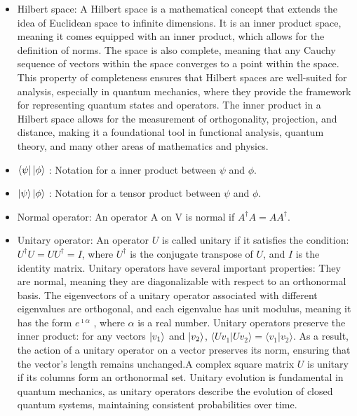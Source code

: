 \documentclass{article}
\begin{document}
		\begin{itemize}
			\item Hilbert space: A Hilbert space is a mathematical concept that extends the idea of Euclidean space to infinite dimensions. It is an inner product space, meaning it comes equipped with an inner product, which allows for the definition of norms. The space is also complete, meaning that any Cauchy sequence of vectors within the space converges to a point within the space. This property of completeness ensures that Hilbert spaces are well-suited for analysis, especially in quantum mechanics, where they provide the framework for representing quantum states and operators. The inner product in a Hilbert space allows for the measurement of orthogonality, projection, and distance, making it a foundational tool in functional analysis, quantum theory, and many other areas of mathematics and physics.
			
			\item $\bra{\psi}\ket{\phi}$ : Notation for a inner product between $\psi$ and $\phi$.
			
			\item $\ket{\psi}\ket{\phi}$ : Notation for a tensor product between $\psi$ and $\phi$.
			
			\item Normal operator: An operator A on V is normal if $A^\dag A = A A^\dag$.
			
			\item Unitary operator: An operator \( U \) is called unitary if it satisfies the condition: $U^\dag U = UU^\dag = I$, where \( U^\dag \) is the conjugate transpose of \( U \), and \( I \) is the identity matrix. Unitary operators have several important properties: They are normal, meaning they are diagonalizable with respect to an orthonormal basis. The eigenvectors of a unitary operator associated with different eigenvalues are orthogonal, and each eigenvalue has unit modulus, meaning it has the form $e^{\imath \alpha}$ , where \( \alpha \) is a real number. Unitary operators preserve the inner product: for any vectors $\ket{v_1}$ and $\ket{v_2}$,
			$\langle U v_1 | U v_2 \rangle = \langle v_1 | v_2 \rangle$.
			As a result, the action of a unitary operator on a vector preserves its norm, ensuring that the vector's length remains unchanged.A complex square matrix \( U \) is unitary if its columns form an orthonormal set. Unitary evolution is fundamental in quantum mechanics, as unitary operators describe the evolution of closed quantum systems, maintaining consistent probabilities over time.
			 

\end{itemize}
\end{document}
